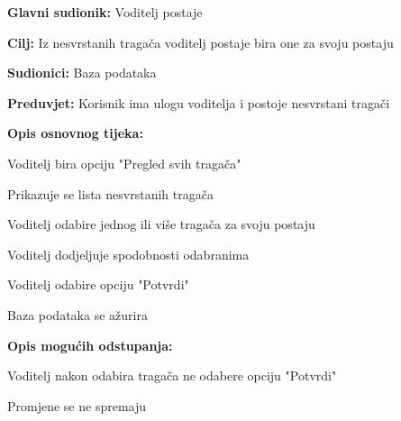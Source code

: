 					\begin{packed_item}
	
						\item \textbf{Glavni sudionik: }  Voditelj postaje
						\item  \textbf{Cilj:} Iz nesvrstanih tragača voditelj postaje bira one za svoju postaju
						\item  \textbf{Sudionici:} Baza podataka
						\item  \textbf{Preduvjet:} Korisnik ima ulogu voditelja i postoje nesvrstani tragači
						\item  \textbf{Opis osnovnog tijeka:} 
						
						
						\item[] \begin{packed_enum}
	
							\item  Voditelj bira opciju "Pregled svih tragača"
							\item  Prikazuje se lista nesvrstanih tragača
							\item  Voditelj odabire jednog ili više tragača za svoju postaju
							\item  Voditelj dodjeljuje spodobnosti odabranima
							\item  Voditelj odabire opciju "Potvrdi"
							\item  Baza podataka se ažurira
							
						\end{packed_enum}

						\item  \textbf{Opis mogućih odstupanja:}
						
						\item[] \begin{packed_item}
	
							\item[5.a] Voditelj nakon odabira tragača ne odabere opciju "Potvrdi"
							\item[] \begin{packed_enum}
								\item Promjene se ne spremaju
							\end{packed_enum}
						\end{packed_item}
					\end{packed_item}
